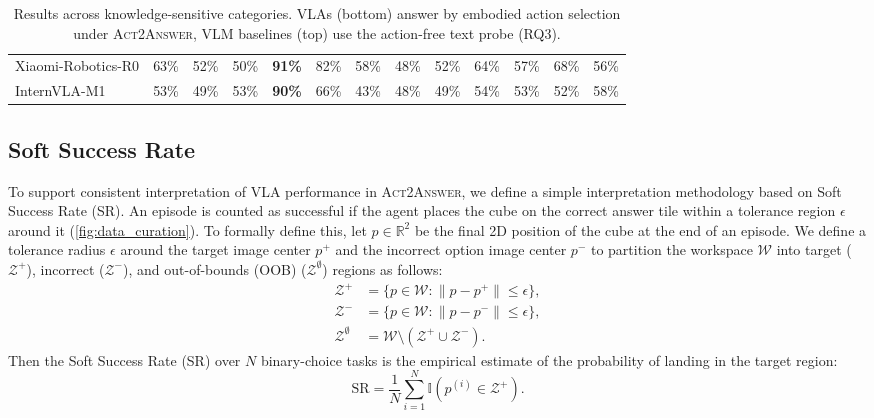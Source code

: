 \documentclass{llmxive}
\providecommand{\heatDG}[1]{\cellcolor{mydarkgreen}\textbf{#1}}
\providecommand{\heatG}[1]{\cellcolor{mygreen}#1}
\providecommand{\heatLG}[1]{\cellcolor{mylightgreen}#1}
\providecommand{\heatO}[1]{\cellcolor{myorange}#1}
\providecommand{\heatR}[1]{\cellcolor{myred}#1}
\begin{document}
\begin{table}[t]
{\begin{tabular}{lcccccccccccc}
Xiaomi-Robotics-R0
& \heatG{63\%}
& \heatO{52\%}
& \heatO{50\%}
& \heatDG{91\%}
& \heatG{82\%}
& \heatLG{58\%}
& \heatO{48\%}
& \heatO{52\%}
& \heatG{64\%}
& \heatLG{57\%}
& \heatG{68\%}
& \heatLG{56\%} \\

InternVLA-M1
& \heatO{53\%} & \heatO{49\%} & \heatO{53\%} & \heatDG{90\%} & \heatG{66\%} & \heatR{43\%} & \heatO{48\%} & \heatO{49\%} & \heatLG{54\%} & \heatO{53\%} & \heatO{52\%} & \heatLG{58\%} \\

\bottomrule
\end{tabular}%
}
\caption{Results across knowledge-sensitive categories. VLAs (bottom) answer by embodied action selection under \textsc{Act2Answer}, VLM baselines (top) use the action-free text probe (RQ3).}
\label{tab:act2answer_emotion_attribute_state}
\end{table}



\subsection{Soft Success Rate}
\label{subsec:soft_success_rate}

To support consistent interpretation of VLA performance in \textsc{Act2Answer}, we define a simple interpretation methodology based on Soft Success Rate (SR). An episode is counted as successful if the agent places the cube on the correct answer tile within a tolerance region $\epsilon$ around it (\autoref{fig:data_curation}). To formally define this, let $p \in \mathbb{R}^2$ be the final 2D position of the cube at the end of an episode. We define a tolerance radius $\epsilon$ around the target image center $p^+$ and the incorrect option image center $p^-$ to partition the workspace $\mathcal{W}$ into target ($\mathcal{Z}^{+}$), incorrect ($\mathcal{Z}^{-}$), and
out-of-bounds (OOB) ($\mathcal{Z}^{\emptyset}$) regions as follows:
\begin{align}
\mathcal{Z}^+ &= \{p \in \mathcal{W} : \|p - p^+\| \le \epsilon\}, \\
\mathcal{Z}^- &= \{p \in \mathcal{W} : \|p - p^-\| \le \epsilon\}, \\
\mathcal{Z}^{\emptyset} &= \mathcal{W} \setminus (\mathcal{Z}^+ \cup \mathcal{Z}^-).
\end{align}
Then the Soft Success Rate (SR) over $N$ binary-choice tasks is the empirical estimate of the probability of landing in the target region:
\begin{equation}
\mathrm{SR} = \frac{1}{N}\sum_{i=1}^{N} \mathbb{I}\!\left(p^{(i)} \in \mathcal{Z}^+\right).
\end{equation}
\end{document}
